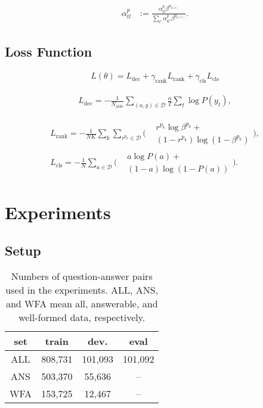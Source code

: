 \documentclass[11pt,a4paper]{article}
\theoremstyle{mydef}
\theoremstyle{myprob}
\begin{document}
\begin{align}
\alpha^p_{tl} & := \frac{\alpha^p_{tl} \beta^{p_{k(l)} }}{\sum_{l'} \alpha^p_{tl'} \beta^{p_{k(l')}}}.
\end{align}

\subsection{Loss Function}

\begin{align}
L(\theta) = L_\mathrm{dec} + \gamma_\mathrm{rank} L_\mathrm{rank} + \gamma_\mathrm{cls} L_\mathrm{cls}
\end{align}

\begin{align}
L_\mathrm{dec} = - \frac{1}{N_\mathrm{able}}\sum_{(a,y)\in \mathcal{D}} \frac{a}{T} \sum_t \log P(y_{t}),
\end{align}

\begingroup\makeatletter{}\check@mathfonts
\begin{gather}
L_\mathrm{rank} = -  \frac{1}{NK} \sum_k \sum_{r^{p_k}\in\mathcal{D}}  
\biggl(
\begin{split}
&r^{p_k} \log \beta^{p_k} +  \\
&(1-r^{p_k}) \log (1-\beta^{p_k}) 
\end{split}
\biggr),\\
L_\mathrm{cls} = - \frac{1}{N} \sum_{a \in \mathcal{D}} 
\biggl(
\begin{split}
&a \log P(a) + \\
&(1-a) \log (1-P(a)) 
\end{split}
\biggr).
\end{gather}
\endgroup

\section{Experiments}

\subsection{Setup}

\begin{table}[t!]
\centering
{\small \tabcolsep=5pt
\begin{tabular}{c|ccc}
\hline
set   & train & dev. & eval \\ \hline
ALL & 808,731 & 101,093 & 101,092\\
ANS & 503,370 & 55,636 & --\\
WFA & 153,725 & 12,467 & --\\
\hline
\end{tabular} \\
}
\caption{Numbers of question-answer pairs used in the experiments. ALL, ANS, and WFA mean all, answerable, and well-formed data, respectively.}
\label{tb:data}
\end{table}
\end{document}
